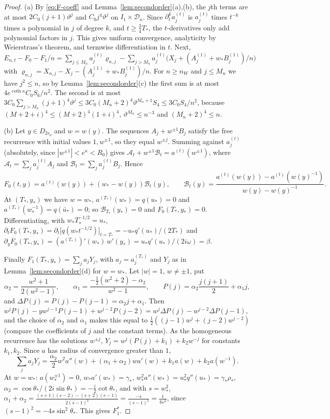 \documentclass[11pt]{amsart}
\theoremstyle{definition}
\theoremstyle{remark}
\numberwithin{equation}{section}
\begin{document}
\begin{proof}
(a) By \eqref{eq:F-coeff} and Lemma~\ref{lem:secondorder}(a),(b), the $j$th terms are at most $2C_0(j+1)\vartheta^j$ and
$C_0j^4\vartheta^j$ on $I_1\times\mathcal D_\kappa$. Since $\partial_t^ka^{(t)}_j$ is $a^{(t)}_j$ times $t^{-k}$ times a
polynomial in $j$ of degree $k$, and $t\ge\frac34T_*$, the $t$-derivatives only add polynomial factors in $j$. This gives
uniform convergence, analyticity by Weierstrass's theorem, and termwise differentiation in $t$. Next,
$E_{n,t}-F_0-F_1/n=\sum_{j\le M_n}a^{(t)}_j\varrho_{n,j}-\sum_{j>M_n}a^{(t)}_j\bigl(X_j+(A^{(1)}_j+w_*B^{(1)}_j)/n\bigr)$ with
$\varrho_{n,j}=X_{n,j}-X_j-(A^{(1)}_j+w_*B^{(1)}_j)/n$. For $n\ge n_W$ and $j\le M_n$ we have $j^2\le n$, so by
Lemma~\ref{lem:secondorder}(c) the first sum is at most $4e^{\coth\kappa}C_0S_6/n^2$. The second is at most
$3C_0\sum_{j>M_n}(j+1)^4\vartheta^j\le3C_0(M_n+2)^4\vartheta^{M_n+1}S_4\le3C_0S_4/n^2$, because
$(M+2+i)^4\le(M+2)^4(1+i)^4$, $\vartheta^{M_n}\le n^{-3}$ and $(M_n+2)^4\le n$.

(b) Let $y\in D_{2r_0}$ and $w=w(y)$. The sequences $A_j+w^{\pm1}B_j$ satisfy the free recurrence with initial values
$1,w^{\pm1}$, so they equal $w^{\pm j}$. Summing against $a^{(t)}_j$ (absolutely, since $|w^{\pm1}|<e^\kappa<R_0$) gives
$\mathcal A_t+w^{\pm1}\mathcal B_t=a^{(t)}(w^{\pm1})$, where $\mathcal A_t=\sum_ja^{(t)}_jA_j$ and
$\mathcal B_t=\sum_ja^{(t)}_jB_j$. Hence
\[
F_0(t,y)=a^{(t)}(w(y))+(w_*-w(y))\mathcal B_t(y),\qquad
\mathcal B_t(y)=\frac{a^{(t)}(w(y))-a^{(t)}(w(y)^{-1})}{w(y)-w(y)^{-1}} .
\]
At $(T_*,y_*)$ we have $w=w_*$, $a^{(T_*)}(w_*)=q(u_*)=0$ and $a^{(T_*)}(w_*^{-1})=q(\bar u_*)=0$; so
$\mathcal B_{T_*}(y_*)=0$ and $F_0(T_*,y_*)=0$. Differentiating, with $w_*T_*^{-1/2}=u_*$,
$\partial_tF_0(T_*,y_*)=\partial_t\bigl[q(w_*t^{-1/2})\bigr]_{t=T_*}=-u_*q'(u_*)/(2T_*)$ and
$\partial_yF_0(T_*,y_*)=(a^{(T_*)})'(w_*)\,w'(y_*)=u_*q'(u_*)/(2i\omega)=\beta$.

Finally $F_1(T_*,y_*)=\sum_ja_jY_j$, with $a_j=a^{(T_*)}_j$ and $Y_j$ as in Lemma~\ref{lem:secondorder}(d) for $w=w_*$.
Let $|w|=1$, $w\ne\pm1$, put
\[
\alpha_2=\frac{w^2+1}{2(w^2-1)},\qquad \alpha_1=\frac{-\frac12(w^2+2)-\alpha_2}{w^2-1},\qquad P(j)=\alpha_2\frac{j(j+1)}2+\alpha_1j,
\]
and $\Delta P(j)=P(j)-P(j-1)=\alpha_2j+\alpha_1$. Then
$w^jP(j)-yw^{j-1}P(j-1)+w^{j-2}P(j-2)=w^j\Delta P(j)-w^{j-2}\Delta P(j-1)$, and the choice of $\alpha_2$ and $\alpha_1$
makes this equal to $\frac12((j-1)w^j+(j-2)w^{j-2})$ (compare the coefficients of $j$ and the constant terms). As the
homogeneous recurrence has the solutions $w^{\pm j}$, $Y_j=w^j(P(j)+k_1)+k_2w^{-j}$ for constants $k_1,k_2$. Since $a$
has radius of convergence greater than $1$,
\[
\sum_ja_jY_j=\frac{\alpha_2}2w^2a''(w)+(\alpha_1+\alpha_2)wa'(w)+k_1a(w)+k_2a(w^{-1}).
\]
At $w=w_*$: $a(w_*^{\pm1})=0$, $w_*a'(w_*)=\gamma_*$, $w_*^2a''(w_*)=u_*^2q''(u_*)=\gamma_*\rho_*$,
$\alpha_2=\cos\theta_*/(2i\sin\theta_*)=-\frac i2\cot\theta_*$, and with $s=w_*^2$,
$\alpha_1+\alpha_2=\frac{(s+1)(s-2)-(s+2)(s-1)}{2(s-1)^2}=\frac{-s}{(s-1)^2}=\frac1{4\omega^2}$, since
$(s-1)^2=-4s\sin^2\theta_*$. This gives $F_1^*$.


\end{proof}
\end{document}
